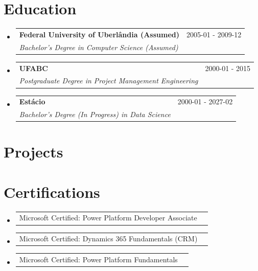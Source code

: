 \documentclass[a4paper,11pt]{article}
\makeatletter
\newcommand{\resumeSubheading}[4]{
  \vspace{-1pt}\item
  \begin{tabular*}{0.97\textwidth}{l@{\extracolsep{\fill}}r}
    \textbf{#1} & #2 \\
    \textit{\small#3} & \textit{\small #4} \\
  \end{tabular*}\vspace{-5pt}
}
\newcommand{\resumeCertification}[2]{%
  \item
  \begin{tabular*}{0.97\textwidth}{@{}l@{\extracolsep{\fill}}r@{}}
    #1 & \text{#2} \\
  \end{tabular*}\vspace{-4pt}
}
\newcommand{\resumeSubHeadingListStart}{\begin{itemize}[leftmargin=0em, itemindent=0em, label={}, itemsep=0ex]}
\newcommand{\resumeSubHeadingListEnd}{\end{itemize}}
\makeatother
\begin{document}
\section{Education}
\resumeSubHeadingListStart

\resumeSubheading
{Federal University of Uberlândia (Assumed)}{2005-01 - 2009-12}
{Bachelor's Degree in Computer Science (Assumed)}{}

\resumeSubheading
{UFABC}{2000-01 - 2015}
{Postgraduate Degree in Project Management Engineering}{}

\resumeSubheading
{Estácio}{2000-01 - 2027-02}
{Bachelor's Degree (In Progress) in Data Science}{}
\resumeSubHeadingListEnd

\section{Projects}
\resumeSubHeadingListStart
\resumeSubHeadingListEnd

\section{Certifications}
\resumeSubHeadingListStart
\resumeCertification{Microsoft Certified: Power Platform Developer Associate}{2025}{}{}
\resumeCertification{Microsoft Certified: Dynamics 365 Fundamentals (CRM)}{2023}{}{}
\resumeCertification{Microsoft Certified: Power Platform Fundamentals}{2023}{}{}
\resumeSubHeadingListEnd
\end{document}
